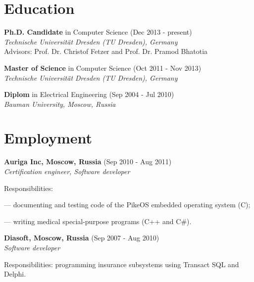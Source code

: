 \documentclass[letterpaper]{article}
\renewenvironment{itemize}{
  \begin{list}{}{
    \setlength{\leftmargin}{1.5em}
  }
}{
  \end{list}
}
\begin{document}
\section*{Education}

\begin{itemize}

 \item \textbf{Ph.D. Candidate} in Computer Science (Dec 2013 - present)\\
 {\em  Technische Universit{\"a}t Dresden (TU Dresden), Germany}\\
Advisors: Prof. Dr. Christof Fetzer and Prof. Dr. Pramod Bhatotia

 \item \textbf{Master of Science} in Computer Science (Oct 2011 - Nov 2013) \\
 {\em  Technische Universit{\"a}t Dresden (TU Dresden), Germany}


\item \textbf{Diplom} in Electrical Engineering (Sep 2004 - Jul 2010)\\
  {\em Bauman University, Moscow, Russia} 

\end{itemize}



\section*{Employment}

{\bf Auriga Inc, Moscow, Russia} (Sep 2010 - Aug 2011)\\
{\em Certification engineer, Software developer}
\begin{itemize}
	\item Responsibilities:
		\begin{itemize}
		\item --- documenting and testing code of the PikeOS embedded operating system (C);
		\item --- writing medical special-purpose programs (C++ and C\#).
		\end{itemize}
	\item 
\end{itemize}

{\bf Diasoft, Moscow, Russia} (Sep 2007 - Aug 2010)\\
{\em Software developer}
\begin{itemize}
	\item Responsibilities: programming insurance subsystems using Transact SQL and Delphi.
\end{itemize}
\end{document}
